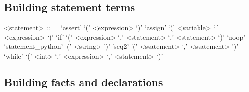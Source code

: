 \subsection{Building statement terms}

\begin{grammar}
<statement> ::=
~\alt `assert' `(' <expression> `)'
\alt `assign' `(' <variable> `,' <expression> `)'
\alt `if' `(' <expression> `,' <statement> `,' <statement> `)'
\alt `noop'
\alt `statement_python' `(' <string> `)'
\alt `seq2' `(' <statement> `,' <statement> `)'
\alt `while' `(' <int> `,' <expression> `,' <statement> `)'
\end{grammar}

\subsection{Building facts and declarations}

